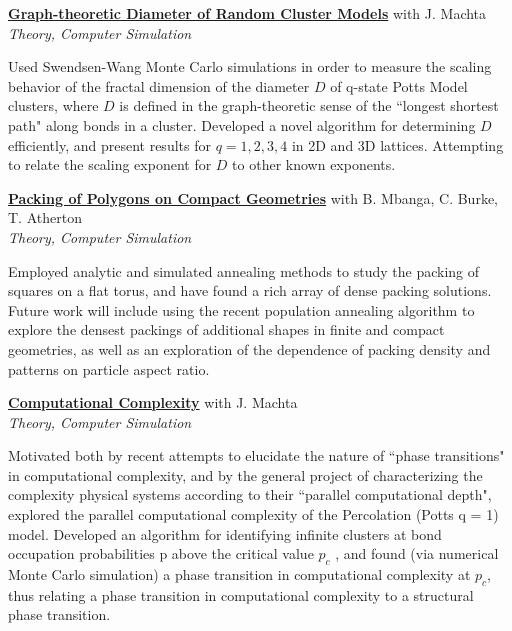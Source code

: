 \documentclass[10pt]{article}
\newcommand{\blankline}{\quad\pagebreak[3]}
\newcommand{\halfblankline}{\quad\vspace{-0.5\baselineskip}\pagebreak[3]}
\begin{document}
\blankline

\href{http://dwblair.github.io}{\textbf{Graph-theoretic Diameter of Random Cluster Models}} \hfill {with J. Machta} \\
\emph{Theory, Computer Simulation} 

\halfblankline

Used Swendsen-Wang Monte Carlo simulations in order to measure the scaling behavior of the fractal
dimension of the diameter $D$ of q-state Potts Model clusters, where $D$ is defined in the graph-theoretic
sense of the ``longest shortest path" along bonds in a cluster. Developed a novel algorithm for
determining $D$ efficiently, and present results for $q = 1, 2, 3, 4$ in 2D and 3D lattices. Attempting to
relate the scaling exponent for $D$ to other known exponents.

\blankline

\href{http://dwblair.github.io}{\textbf{Packing of Polygons on Compact Geometries}} \hfill {with B. Mbanga, C. Burke, T. Atherton} \\
\emph{Theory, Computer Simulation} 

\halfblankline

Employed analytic and simulated annealing methods to study the packing of squares on a flat torus, and
have found a rich array of dense packing solutions. Future work will include using the recent population
annealing algorithm to explore the densest packings of additional shapes in finite and compact geometries, as well as an exploration of the dependence of packing density and patterns on particle aspect ratio. 

\blankline

\href{http://dwblair.github.io}{\textbf{Computational Complexity}} \hfill {with J. Machta} \\
\emph{Theory, Computer Simulation} 

\halfblankline

Motivated both by recent attempts to elucidate the nature of ``phase transitions" in computational complexity, and by the general project of characterizing the complexity physical systems according to their
``parallel computational depth", explored the parallel computational complexity of the Percolation
(Potts q = 1) model. Developed an algorithm for identifying infinite clusters at bond occupation
probabilities p above the critical value $p_{c}$ , and found (via numerical Monte Carlo simulation) a
phase transition in computational complexity at $p_{c}$, thus relating a phase transition in computational
complexity to a structural phase transition.
\end{document}
